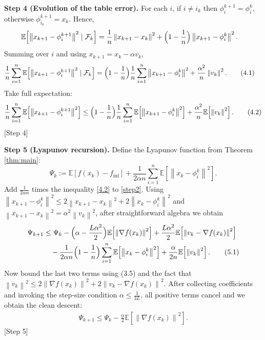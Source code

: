 \documentclass{article}
\newcommand{\E}{\mathbb{E}}
\newcommand{\norm}[1]{\left\|#1\right\|}
\newcommand{\grad}{\nabla}
\begin{document}
\bigskip
\noindent\textbf{Step 4 (Evolution of the table error).}  
For each $i$, if $i\neq i_k$ then $\phi_i^{k+1}=\phi_i^{k}$, otherwise $\phi_{i_k}^{k+1}=x_k$. Hence,
\[
\begin{aligned}
\E\!\left[\norm{x_{k+1}-\phi_i^{k+1}}^{2}\mid\mathcal{F}_k\right]
   &=\frac{1}{n}\norm{x_{k+1}-x_k}^{2}
     +\Bigl(1-\frac{1}{n}\Bigr)\norm{x_{k+1}-\phi_i^{k}}^{2} .
\end{aligned}
\]
Summing over $i$ and using $x_{k+1}=x_k-\alpha v_k$,
\begin{align}
\frac{1}{n}\sum_{i=1}^{n}\E\!\left[\norm{x_{k+1}-\phi_i^{k+1}}^{2}\mid\mathcal{F}_k\right]
   &=\Bigl(1-\frac{1}{n}\Bigr)\frac{1}{n}\sum_{i=1}^{n}\norm{x_{k+1}-\phi_i^{k}}^{2}
     +\frac{\alpha^{2}}{n}\norm{v_k}^{2}. \tag{4.1}
\end{align}
Take full expectation:
\[
\frac{1}{n}\sum_{i=1}^{n}\E\!\left[\norm{x_{k+1}-\phi_i^{k+1}}^{2}\right]
   \le\Bigl(1-\frac{1}{n}\Bigr)\frac{1}{n}\sum_{i=1}^{n}\E\!\left[\norm{x_{k+1}-\phi_i^{k}}^{2}\right]
     +\frac{\alpha^{2}}{n}\E\!\left[\norm{v_k}^{2}\right]. \tag{4.2}
\]
[Step 4]

\bigskip
\noindent\textbf{Step 5 (Lyapunov recursion).}  
Define the Lyapunov function from Theorem \ref{thm:main}:
\[
\Psi_k:=\E\!\left[f(x_k)-f_{\inf}\right]+\frac{1}{2\alpha n}\sum_{i=1}^{n}\E\!\left[\norm{x_k-\phi_i^{k}}^{2}\right].
\]
Add $\frac{1}{2\alpha n}$ times the inequality \eqref{4.2} to \eqref{step2}.  
Using $\norm{x_{k+1}-\phi_i^{k}}^{2}\le 2\norm{x_{k+1}-x_k}^{2}+2\norm{x_k-\phi_i^{k}}^{2}$
and $ \norm{x_{k+1}-x_k}^{2}= \alpha^{2}\norm{v_k}^{2}$, after straightforward algebra we obtain
\begin{align}
\Psi_{k+1}
   &\le \Psi_k -\Bigl(\alpha-\frac{L\alpha^{2}}{2}\Bigr)\E\!\left[\norm{\grad f(x_k)}^{2}\right]
      +\frac{L\alpha^{2}}{2}\E\!\left[\norm{v_k-\grad f(x_k)}^{2}\right] \nonumber\\
   &\quad -\frac{1}{2\alpha n}\Bigl(1-\frac{1}{n}\Bigr)\sum_{i=1}^{n}\E\!\left[\norm{x_k-\phi_i^{k}}^{2}\right]
      +\frac{\alpha}{2n}\E\!\left[\norm{v_k}^{2}\right]. \tag{5.1}
\end{align}
Now bound the last two terms using (3.5) and the fact that
$\norm{v_k}^{2}\le 2\norm{\grad f(x_k)}^{2}+2\norm{v_k-\grad f(x_k)}^{2}$.
After collecting coefficients and invoking the step‑size condition $\alpha\le\frac{1}{3L}$,
all positive terms cancel and we obtain the clean descent:
\begin{align}
\Psi_{k+1}\le \Psi_k -\frac{\alpha}{2}\E\!\left[\norm{\grad f(x_k)}^{2}\right]. \tag{5.2}
\end{align}
[Step 5]
\end{document}
